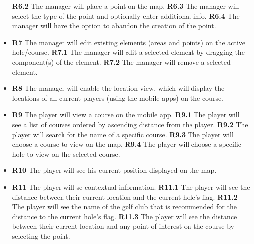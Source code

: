 \documentclass{article}
\begin{document}
\begin{itemize}
            \subitem \textbf{R6.2} The manager will place a point on the map.
            \subitem \textbf{R6.3} The manager will select the type of the
            point and optionally enter additional info.
            \subitem \textbf{R6.4} The manager will have the option to abandon
            the creation of the point.
        \item
            \textbf{R7} The manager will edit existing elements (areas and
            points) on the active hole/course.
            \subitem \textbf{R7.1} The manager will edit a selected element by
            dragging the component(s) of the element.
            \subitem \textbf{R7.2} The manager will remove a selected element.
        \item
            \textbf{R8} The manager will enable the location view, which will
            display the locations of all current players (using the mobile
            apps) on the course.
        \item
            \textbf{R9} The player will view a course on the mobile app.
            \subitem \textbf{R9.1} The player will see a list of courses
            ordered by ascending distance from the player.
            \subitem \textbf{R9.2} The player will search for the name of a
            specific course.
            \subitem \textbf{R9.3} The player will choose a course to view on
            the map.
            \subitem \textbf{R9.4} The player will choose a specific hole to
            view on the selected course.
        \item
            \textbf{R10} The player will see his current position displayed on
            the map.
        \item
            \textbf{R11} The player will se contextual information.
            \subitem \textbf{R11.1} The player will see the distance between their
            current location and the current hole's flag.
            \subitem \textbf{R11.2} The player will see the name of the golf club
            that is recommended for the distance to the current hole's flag.
            \subitem \textbf{R11.3} The player will see the distance between
            their current location and any point of interest on the course by
            selecting the point.
    \end{itemize}
\end{document}
